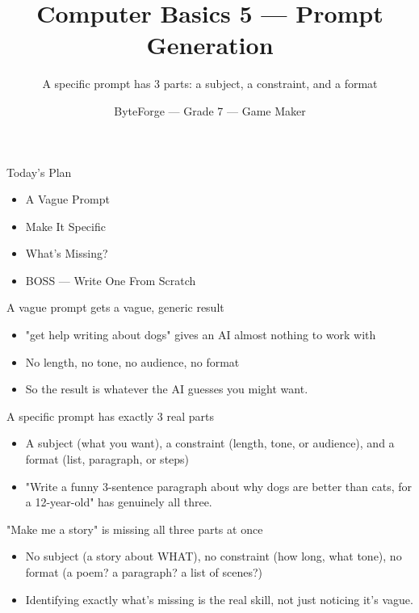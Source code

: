 \documentclass[aspectratio=169]{beamer}
\title{Computer Basics 5 — Prompt Generation}
\subtitle{A specific prompt has 3 parts: a subject, a constraint, and a format}
\author{ByteForge --- Grade 7 --- Game Maker}
\date{}
\begin{document}
\begin{frame}
    \titlepage
\end{frame}

\begin{frame}{Today's Plan}
    \begin{itemize}
        \item A Vague Prompt
        \item Make It Specific
        \item What's Missing?
        \item[$\bigstar$] BOSS --- Write One From Scratch
    \end{itemize}
\end{frame}

\begin{frame}{A vague prompt gets a vague, generic result}
    \large
    \begin{itemize}
        \item "get help writing about dogs" gives an AI almost nothing to work with
        \item No length, no tone, no audience, no format
        \item So the result is whatever the AI guesses you might want.
    \end{itemize}
\end{frame}


\begin{frame}{A specific prompt has exactly 3 real parts}
    \large
    \begin{itemize}
        \item A subject (what you want), a constraint (length, tone, or audience), and a format (list, paragraph, or steps)
        \item "Write a funny 3-sentence paragraph about why dogs are better than cats, for a 12-year-old" has genuinely all three.
    \end{itemize}
\end{frame}


\begin{frame}{"Make me a story" is missing all three parts at once}
    \large
    \begin{itemize}
        \item No subject (a story about WHAT), no constraint (how long, what tone), no format (a poem? a paragraph? a list of scenes?)
        \item Identifying exactly what's missing is the real skill, not just noticing it's vague.
    \end{itemize}
\end{frame}
\end{document}
